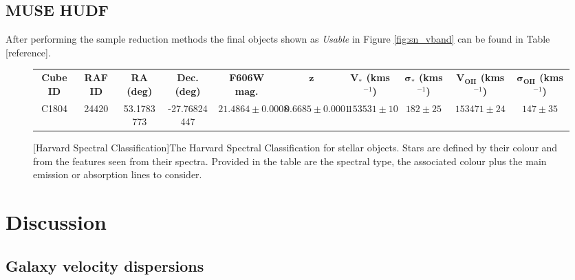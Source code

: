 \documentclass[12pt, twocolumn]{revtex4}    %
\begin{document}
\subsection{MUSE HUDF}
\noindent

After performing the sample reduction methods the final objects shown as \textit{Usable} in Figure \ref{fig:sn_vband} can be found in Table [reference].

\begin{figure}
\begin{center}
\begin{tabular}{c@{\hskip 10pt}c@{\hskip 10pt}c@{\hskip 10pt}c@{\hskip 10pt}c@{\hskip 10pt}c@{\hskip 10pt}c@{\hskip 10pt}c@{\hskip 10pt}c@{\hskip 10pt}c} 
 \hline
 \textbf{Cube ID} & \textbf{RAF ID} & \textbf{RA (deg)} & \textbf{Dec. (deg)} & \textbf{F606W mag.} & \textbf{$\boldsymbol{z}$} & \textbf{$\boldsymbol{V_*}$ (kms$^{-1}$)} & \textbf{$\boldsymbol{\sigma_*}$ (kms$^{-1}$)} & \textbf{$\boldsymbol{V_{OII}}$ (kms$^{-1}$)} & \textbf{$\boldsymbol{\sigma_{OII}}$ (kms$^{-1}$)} \\ [0.5ex] 
 C1804 & 24420 & 53.1783773 & -27.76824447 & $21.4864\pm0.0008$ & $0.6685\pm0.0001$ & $153531\pm10$ & $182\pm25$ & $153471\pm24$ & $ 147\pm35$ \\
 \hline
\end{tabular}
\captionsetup{justification=raggedright}
[Harvard Spectral Classification]{The Harvard Spectral Classification for stellar objects. Stars are defined by their colour and from the features seen from their spectra. Provided in the table are the spectral type, the associated colour plus the main emission or absorption lines to consider.}
\label{table:final_sample}
\end{center}
\end{figure}


\section{Discussion}

\subsection{Galaxy velocity dispersions}
\end{document}

